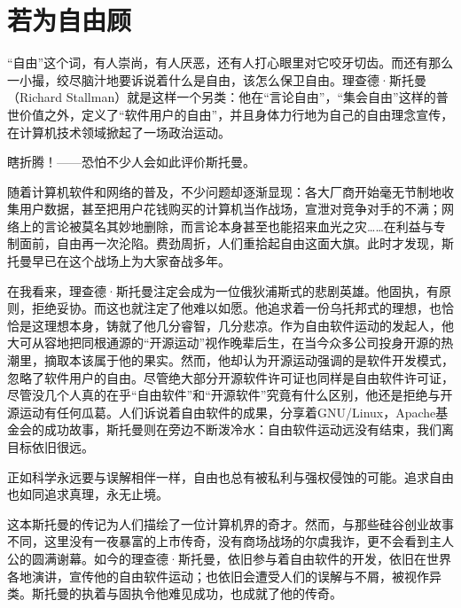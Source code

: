 \chapter{若为自由顾}

``自由''这个词，有人崇尚，有人厌恶，还有人打心眼里对它咬牙切齿。而还有那么一小撮，绞尽脑汁地要诉说着什么是自由，该怎么保卫自由。理查德·斯托曼（Richard Stallman）就是这样一个另类：他在``言论自由''，``集会自由''这样的普世价值之外，定义了``软件用户的自由''，并且身体力行地为自己的自由理念宣传，在计算机技术领域掀起了一场政治运动。

瞎折腾！——恐怕不少人会如此评价斯托曼。

随着计算机软件和网络的普及，不少问题却逐渐显现：各大厂商开始毫无节制地收集用户数据，甚至把用户花钱购买的计算机当作战场，宣泄对竞争对手的不满；网络上的言论被莫名其妙地删除，而言论本身甚至也能招来血光之灾……在利益与专制面前，自由再一次沦陷。费劲周折，人们重拾起自由这面大旗。此时才发现，斯托曼早已在这个战场上为大家奋战多年。

在我看来，理查德·斯托曼注定会成为一位俄狄浦斯式的悲剧英雄。他固执，有原则，拒绝妥协。而这也就注定了他难以如愿。他追求着一份乌托邦式的理想，也恰恰是这理想本身，铸就了他几分睿智，几分悲凉。作为自由软件运动的发起人，他大可从容地把同根通源的``开源运动''视作晚辈后生，在当今众多公司投身开源的热潮里，摘取本该属于他的果实。然而，他却认为开源运动强调的是软件开发模式，忽略了软件用户的自由。尽管绝大部分开源软件许可证也同样是自由软件许可证，尽管没几个人真的在乎“自由软件”和“开源软件”究竟有什么区别，他还是拒绝与开源运动有任何瓜葛。人们诉说着自由软件的成果，分享着GNU/Linux，Apache基金会的成功故事，斯托曼则在旁边不断泼冷水：自由软件运动远没有结束，我们离目标依旧很远。

正如科学永远要与误解相伴一样，自由也总有被私利与强权侵蚀的可能。追求自由也如同追求真理，永无止境。

这本斯托曼的传记为人们描绘了一位计算机界的奇才。然而，与那些硅谷创业故事不同，这里没有一夜暴富的上市传奇，没有商场战场的尔虞我诈，更不会看到主人公的圆满谢幕。如今的理查德·斯托曼，依旧参与着自由软件的开发，依旧在世界各地演讲，宣传他的自由软件运动；也依旧会遭受人们的误解与不屑，被视作异类。斯托曼的执着与固执令他难见成功，也成就了他的传奇。

